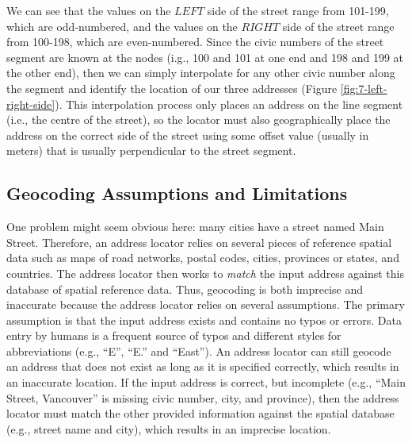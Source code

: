 \documentclass[
]{book}
\begin{document}
We can see that the values on the \(LEFT\) side of the street range from 101-199, which are odd-numbered, and the values on the \(RIGHT\) side of the street range from 100-198, which are even-numbered. Since the civic numbers of the street segment are known at the nodes (i.g., 100 and 101 at one end and 198 and 199 at the other end), then we can simply interpolate for any other civic number along the segment and identify the location of our three addresses (Figure \ref{fig:7-left-right-side}). This interpolation process only places an address on the line segment (i.e., the centre of the street), so the locator must also geographically place the address on the correct side of the street using some offset value (usually in meters) that is usually perpendicular to the street segment.

\hypertarget{geocoding-assumptions-and-limitations}{%
\subsection{Geocoding Assumptions and Limitations}\label{geocoding-assumptions-and-limitations}}

One problem might seem obvious here: many cities have a street named Main Street. Therefore, an address locator relies on several pieces of reference spatial data such as maps of road networks, postal codes, cities, provinces or states, and countries. The address locator then works to \emph{match} the input address against this database of spatial reference data. Thus, geocoding is both imprecise and inaccurate because the address locator relies on several assumptions. The primary assumption is that the input address exists and contains no typos or errors. Data entry by humans is a frequent source of typos and different styles for abbreviations (e.g., ``E'', ``E.'' and ``East''). An address locator can still geocode an address that does not exist as long as it is specified correctly, which results in an inaccurate location. If the input address is correct, but incomplete (e.g., ``Main Street, Vancouver'' is missing civic number, city, and province), then the address locator must match the other provided information against the spatial database (e.g., street name and city), which results in an imprecise location.
\end{document}
